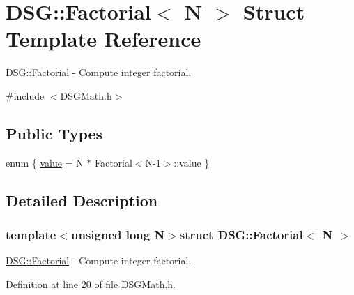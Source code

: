 \hypertarget{struct_d_s_g_1_1_factorial}{\section{D\+S\+G\+:\+:Factorial$<$ N $>$ Struct Template Reference}
\label{struct_d_s_g_1_1_factorial}
}


\hyperlink{struct_d_s_g_1_1_factorial}{D\+S\+G\+::\+Factorial} -\/ Compute integer factorial.  




{\ttfamily \#include $<$D\+S\+G\+Math.\+h$>$}

\subsection*{Public Types}
\begin{DoxyCompactItemize}
\item 
enum \{ \hyperlink{struct_d_s_g_1_1_factorial_a2443a477420ba8fc5494b186a58dcaccaebc078d57d6fc1fbd5953d284c9cde04}{value} = N $\ast$ Factorial$<$N-\/1$>$\+:\+:value
 \}
\end{DoxyCompactItemize}


\subsection{Detailed Description}
\subsubsection*{template$<$unsigned long N$>$struct D\+S\+G\+::\+Factorial$<$ N $>$}

\hyperlink{struct_d_s_g_1_1_factorial}{D\+S\+G\+::\+Factorial} -\/ Compute integer factorial. 

Definition at line \hyperlink{_d_s_g_math_8h_source_l00020}{20} of file \hyperlink{_d_s_g_math_8h_source}{D\+S\+G\+Math.\+h}.



